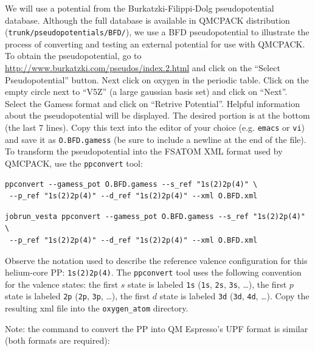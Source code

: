 We will use a potential from the Burkatzki-Filippi-Dolg pseudopotential database.  
Although the full database is available in QMCPACK distribution (\texttt{trunk/pseudopotentials/BFD/}), 
we use a BFD pseudopotential to illustrate the process of converting and testing an 
external potential for use with QMCPACK.   To obtain the pseudopotential, go to 
\href{http://www.burkatzki.com/pseudos/index.2.html}{http://www.burkatzki.com/pseudos/index.2.html}
and click on the ``Select Pseudopotential'' button.  Next click on oxygen in the 
periodic table.  Click on the empty circle next to ``V5Z'' (a large gaussian 
basis set) and click on ``Next''.  Select the Gamess format and click on 
``Retrive Potential''.  Helpful information about the pseudopotential will be 
displayed.  The desired portion is at the bottom (the last 7 lines).  Copy 
this text into the editor of your choice (e.g. \texttt{emacs} or \texttt{vi}) 
and save it as \texttt{O.BFD.gamess} 
(be sure to include a newline at the end of the file).  To transform the 
pseudopotential into the FSATOM XML format used by QMCPACK, use the \texttt{ppconvert} 
tool:

\noindent
\ifws
\begin{shaded}
\begin{verbatim}
ppconvert --gamess_pot O.BFD.gamess --s_ref "1s(2)2p(4)" \
 --p_ref "1s(2)2p(4)" --d_ref "1s(2)2p(4)" --xml O.BFD.xml
\end{verbatim}
\end{shaded}
\else
\begin{shaded}
\begin{verbatim}
jobrun_vesta ppconvert --gamess_pot O.BFD.gamess --s_ref "1s(2)2p(4)" \
 --p_ref "1s(2)2p(4)" --d_ref "1s(2)2p(4)" --xml O.BFD.xml
\end{verbatim}
\end{shaded}
\fi

\noindent
Observe the notation used to describe the reference valence configuration for this helium-core PP: \texttt{1s(2)2p(4)}.  The \texttt{ppconvert} tool uses the following convention for the valence states: the first $s$ state is labeled \texttt{1s} (\texttt{1s}, \texttt{2s}, \texttt{3s}, \ldots), the first $p$ state is labeled \texttt{2p} (\texttt{2p}, \texttt{3p}, \ldots), the first $d$ state is labeled \texttt{3d} (\texttt{3d}, \texttt{4d}, \ldots). Copy the resulting xml file into the \texttt{oxygen\_atom} directory.

Note: the command to convert the PP into QM Espresso's UPF format is similar (both formats are required):

